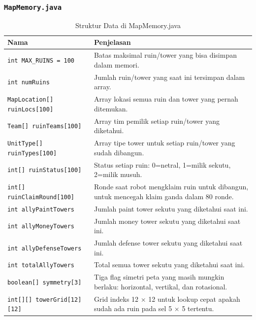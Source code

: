 \documentclass{article}
\begin{document}
\begin{enumerate}[label=\alph*.]
\subsubsection{\lstinline|MapMemory.java|}

\begin{longtable}{|p{}|p{}|}
    \caption{Struktur Data di MapMemory.java} \\
\hline
\textbf{Nama} & \textbf{Penjelasan} \\
\hline
\endhead
\hline
\endfoot
\texttt{int MAX\_RUINS = 100} & Batas maksimal ruin/tower yang bisa disimpan dalam memori. \\
\hline
\texttt{int numRuins} & Jumlah ruin/tower yang saat ini tersimpan dalam array. \\
\hline
\texttt{MapLocation[] ruinLocs[100]} & Array lokasi semua ruin dan tower yang pernah ditemukan. \\
\hline
\texttt{Team[] ruinTeams[100]} & Array tim pemilik setiap ruin/tower yang diketahui. \\
\hline
\texttt{UnitType[] ruinTypes[100]} & Array tipe tower untuk setiap ruin/tower yang sudah dibangun. \\
\hline
\texttt{int[] ruinStatus[100]} & Status setiap ruin: 0=netral, 1=milik sekutu, 2=milik musuh. \\
\hline
\texttt{int[] ruinClaimRound[100]} & Ronde saat robot mengklaim ruin untuk dibangun, untuk mencegah klaim ganda dalam 80 ronde. \\
\hline
\texttt{int allyPaintTowers} & Jumlah paint tower sekutu yang diketahui saat ini. \\
\hline
\texttt{int allyMoneyTowers} & Jumlah money tower sekutu yang diketahui saat ini. \\
\hline
\texttt{int allyDefenseTowers} & Jumlah defense tower sekutu yang diketahui saat ini. \\
\hline
\texttt{int totalAllyTowers} & Total semua tower sekutu yang diketahui saat ini. \\
\hline
\texttt{boolean[] symmetry[3]} & Tiga flag simetri peta yang masih mungkin berlaku: horizontal, vertikal, dan rotasional. \\
\hline
\texttt{int[][] towerGrid[12][12]} & Grid indeks 12 $\times$ 12 untuk lookup cepat apakah sudah ada ruin pada sel 5 $\times$ 5 tertentu. \\
\hline
\end{longtable}


\end{enumerate}
\end{document}
